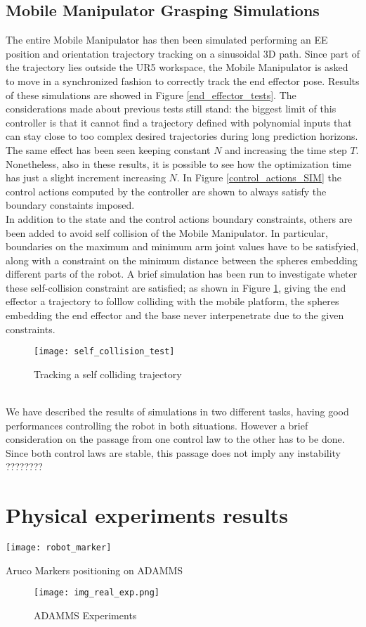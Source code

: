 \subsection{Mobile Manipulator Grasping Simulations}
The entire Mobile Manipulator has then been simulated performing an EE position and orientation trajectory tracking on a sinusoidal 3D path. Since part of the trajectory lies outside the UR5 workspace, the Mobile Manipulator is asked to move in a synchronized fashion to correctly track the end effector pose. 
Results of these simulations are showed in Figure \ref{end_effector_tests}. The considerations made about previous tests still stand: the biggest limit of this controller is that it cannot find a trajectory defined with polynomial inputs that can stay close to too complex desired trajectories during long prediction horizons. The same effect has been seen keeping constant $N$ and increasing the time step $T$. Nonetheless, also in these results, it is possible to see how the optimization time has just a slight increment increasing $N$. In Figure \ref{control_actions_SIM} the control actions computed by the controller are shown to always satisfy the boundary constaints imposed.\\
In addition to the state and the control actions boundary constraints, others are been added to avoid self collision of the Mobile Manipulator. In particular, boundaries on the maximum and minimum arm joint values have to be satisfyied, along with a constraint on the minimum distance between the spheres embedding different parts of the robot. A brief simulation has been run to investigate wheter these self-collision constraint are satisfied; as shown in Figure \ref{self_collision}, giving the end effector a trajectory to folllow colliding with the mobile platform, the spheres embedding the end effector and the base never interpenetrate due to the given constraints.
\begin{figure}[t]
	\centering
	\texttt{[image: self\_collision\_test]}
	\caption{Tracking a self colliding trajectory}
	\label{self_collision}
\end{figure}
\\
We have described the results of simulations in two different tasks, having good performances controlling the robot in both situations. However a brief consideration on the passage from one control law to the other has to be done. Since both control laws are stable, this passage does not imply any instability ????????
\section{Physical experiments results}
\begin{floatingfigure}[l]{.3\textwidth}
	\centering
	\texttt{[image: robot\_marker]}
	\caption{Aruco Markers positioning on ADAMMS\label{robot_marker}}
\end{floatingfigure} 
\begin{figure}[h!]
	\centering
	\texttt{[image: img\_real\_exp.png]}
	\caption{ADAMMS Experiments}
	\label{img_real_exp}
\end{figure}

